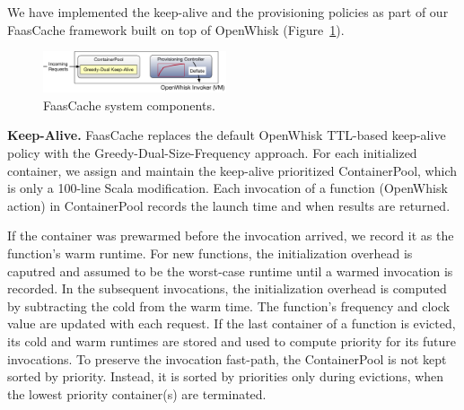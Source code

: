 
We have implemented the keep-alive and the provisioning policies as part of our FaasCache framework built on top of OpenWhisk (Figure~\ref{fig:sys}). 

\begin{figure}[t]
  \centering
  \includegraphics[width=0.48\textwidth]{../figures/faascache.pdf}
  \caption{FaasCache system components.}
  \label{fig:sys}
  \vspace*{\myfigspace}
\end{figure}

\noindent \textbf{Keep-Alive.}
FaasCache replaces the default OpenWhisk TTL-based keep-alive policy with the Greedy-Dual-Size-Frequency approach. 
For each initialized container, we assign and maintain the keep-alive prioritized ContainerPool, which is only a 100-line Scala modification. 
Each invocation of a function (OpenWhisk action) in ContainerPool records the launch time and when results are returned.


If the container was prewarmed before the invocation arrived, we record it as the function's warm runtime.
For new functions, the initialization overhead is caputred and assumed to be the worst-case runtime until a warmed invocation is recorded. %
In the subsequent invocations, the initialization overhead is computed by subtracting the cold from the warm time. 
The function's frequency and clock value are updated with each request.
If the last container of a function is evicted, its cold and warm runtimes are stored and used to compute priority for its future invocations. 
%
To preserve the invocation fast-path, the ContainerPool is not kept sorted by priority. 
Instead, it is sorted by priorities only during evictions, when the lowest priority container(s) are terminated. 

